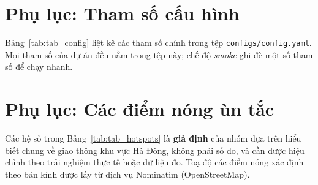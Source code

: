 \newpage
\appendix
\renewcommand{\thesection}{\Alph{section}}
\section{Phụ lục: Tham số cấu hình}\label{app:config}

Bảng~\ref{tab:tab_config} liệt kê các tham số chính trong tệp \texttt{configs/config.yaml}. Mọi tham số của dự án đều nằm
trong tệp này; chế độ \emph{smoke} ghi đè một số tham số để chạy nhanh.



\section{Phụ lục: Các điểm nóng ùn tắc}\label{app:hotspots}

Các hệ số trong Bảng~\ref{tab:tab_hotspots} là \textbf{giả định} của nhóm dựa trên hiểu biết chung về giao thông khu vực Hà
Đông, không phải số đo, và cần được hiệu chỉnh theo trải nghiệm thực tế hoặc dữ liệu đo. Toạ độ các điểm nóng xác định theo
bán kính được lấy từ dịch vụ Nominatim (OpenStreetMap).


